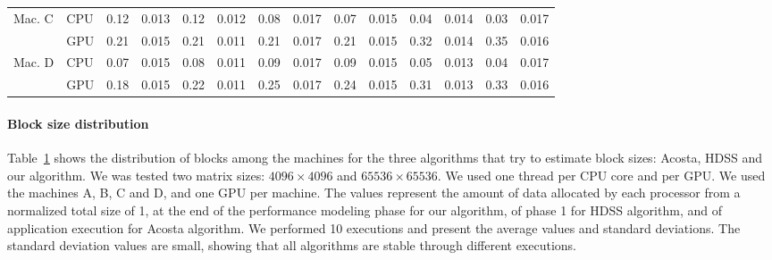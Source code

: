 \documentclass[journal]{IEEEtran}
\begin{document}
\begin{table}[htb]
\begin{scriptsize}
\begin{tabular}{|l|l|l|l|l|l|l|l|l|l|l|l|l|l|}
\hline
Mac. C & CPU & \multicolumn{1}{c|}{0.12} & \multicolumn{1}{c|}{0.013} & \multicolumn{1}{c|}{0.12} & \multicolumn{1}{c|}{0.012} & \multicolumn{1}{c|}{0.08} & \multicolumn{1}{c|}{0.017} & \multicolumn{1}{c|}{0.07} & \multicolumn{1}{c|}{0.015} & \multicolumn{1}{c|}{0.04} & \multicolumn{1}{c|}{0.014} & \multicolumn{1}{c|}{0.03} & \multicolumn{1}{c|}{0.017} \\ 
\cline{2-14}
 & GPU & \multicolumn{1}{c|}{0.21} & \multicolumn{1}{c|}{0.015} & \multicolumn{1}{c|}{0.21} & \multicolumn{1}{c|}{0.011} & \multicolumn{1}{c|}{0.21} & \multicolumn{1}{c|}{0.017} & \multicolumn{1}{c|}{0.21} & \multicolumn{1}{c|}{0.015} & \multicolumn{1}{c|}{0.32} & \multicolumn{1}{c|}{0.014} & \multicolumn{1}{c|}{0.35} & \multicolumn{1}{c|}{0.016} \\ 
\hline
Mac. D & CPU & \multicolumn{1}{c|}{0.07} & \multicolumn{1}{c|}{0.015} & \multicolumn{1}{c|}{0.08} & \multicolumn{1}{c|}{0.011} & \multicolumn{1}{c|}{0.09} & \multicolumn{1}{c|}{0.017} & \multicolumn{1}{c|}{0.09} & \multicolumn{1}{c|}{0.015} & \multicolumn{1}{c|}{0.05} & \multicolumn{1}{c|}{0.013} & \multicolumn{1}{c|}{0.04} & \multicolumn{1}{c|}{0.017} \\ 
\cline{2-14}
 & GPU & \multicolumn{1}{c|}{0.18} & \multicolumn{1}{c|}{0.015} & \multicolumn{1}{c|}{0.22} & \multicolumn{1}{c|}{0.011} & \multicolumn{1}{c|}{0.25} & \multicolumn{1}{c|}{0.017} & \multicolumn{1}{c|}{0.24} & \multicolumn{1}{c|}{0.015} & \multicolumn{1}{c|}{0.31} & \multicolumn{1}{c|}{0.013} & \multicolumn{1}{c|}{0.33} & \multicolumn{1}{c|}{0.016} \\ 
\hline
\end{tabular}
\end{scriptsize}
\label{table: comparativoBlocos}
\end{table}

\paragraph{Block size distribution} Table~\ref{table: comparativoBlocos} shows 
the distribution of blocks among the machines for the three algorithms that try
to estimate block sizes: Acosta, HDSS and our algorithm. We was tested two
matrix sizes: $4096 \times 4096$ and $65536 \times 65536$. We used one thread
per CPU core and per GPU. We used the machines A, B, C and D, and one GPU per
machine. The values represent the amount of data allocated by each processor
from a normalized total size of 1, at the end of the performance modeling phase
for our algorithm, of phase 1 for HDSS algorithm, and of application execution
for Acosta algorithm. We performed 10 executions and present the average values
and standard deviations. The standard deviation values are small, showing that
all algorithms are stable through different executions.
\end{document}
